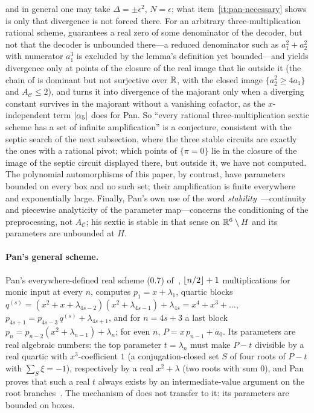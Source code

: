 \begin{remark}
and in general one may take $\Delta=\pm\epsilon^2$, $N=\epsilon$; what
item~\ref{it:pan-necessary} shows is only that divergence is not forced
there.  For an arbitrary three-multiplication rational scheme,
 guarantees a real zero of some denominator of the
decoder, but not that the decoder is unbounded there---a reduced denominator
such as $a_1^2+a_2^2$ with numerator $a_1^3$ is excluded by the lemma's
definition yet bounded---and  yields divergence only
at points of the closure of the real image that lie outside it (the chain of
 is dominant but not surjective over
$\mathbb{R}$, with the closed image $\{a_2^2\ge4a_1\}$ and $A_{\mathcal C}\le2$), and
turns it into divergence of the majorant only when a diverging constant
survives in the majorant without a vanishing cofactor, as the $x$-independent
term $\left\lvert \alpha_5\right\rvert$ does for Pan.  So ``every rational three-multiplication
sextic scheme has a set of infinite amplification'' is a conjecture,
consistent with the septic search of the next subsection, where the three
stable circuits are exactly the ones with a rational pivot; which points of
$\{\pi=0\}$ lie in the closure of the image of the septic circuit displayed
there, but outside it, we have not computed.  The polynomial automorphisms
of this paper, by contrast, have parameters bounded on every box and no such
set; their amplification is finite everywhere and exponentially large.
Finally, Pan's own use of the word
\emph{stability}~\cite[Note~3.1]{pan1966methods}---continuity and piecewise
analyticity of the parameter map---concerns the conditioning of the
preprocessing, not $A_{\mathcal C}$; his sextic is stable in that sense on
$\mathbb{R}^6\setminus H$ and its parameters are unbounded at $H$.
\end{remark}

\paragraph{Pan's general scheme.}
Pan's everywhere-defined real scheme (0.7) of~\cite{pan1966methods},
$\left\lfloor {n/2} \right\rfloor+1$ multiplications for monic input at every $n$, computes
$p_1=x+\lambda_1$, quartic blocks
$q^{(s)}=(x^2+x+\lambda_{4s-2})(x^2+\lambda_{4s-1})+\lambda_{4s}
=x^4+x^3+\dots$, $p_{4s+1}=p_{4s-3}\,q^{(s)}+\lambda_{4s+1}$, and for
$n=4s+3$ a last block $p_n=p_{n-2}(x^2+\lambda_{n-1})+\lambda_n$; for even
$n$, $P=x\,p_{n-1}+a_0$.  Its parameters are real algebraic numbers: the top
parameter $t=\lambda_n$ must make $P-t$ divisible by a real quartic with
$x^3$-coefficient $1$ (a conjugation-closed set $S$ of four roots of $P-t$
with $\sum_S\xi=-1$), respectively by a real $x^2+\lambda$ (two roots with
sum $0$), and Pan proves that such a real $t$ always exists by an
intermediate-value argument on the root branches~\cite[Lemma~3.3]{pan1966methods}.
The mechanism of  does not transfer to it: its
parameters are bounded on boxes.

